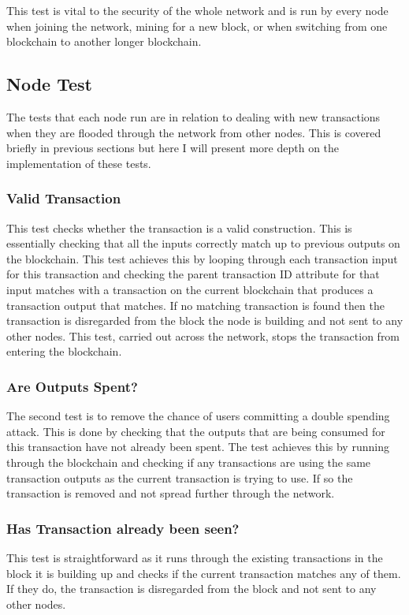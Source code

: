 \documentclass{l4proj}
\begin{document}
This test is vital to the security of the whole network and is run by every node when joining the network,
mining for a new block, or when switching from one blockchain to another longer blockchain.

\subsection{Node Test}
The tests that each node run are in relation to dealing with new transactions when they are flooded through
the network from other nodes. This is covered briefly in previous sections but here I will present more depth
on the implementation of these tests.

\subsubsection{Valid Transaction}
This test checks whether the transaction is a valid construction. This is essentially checking that all the inputs
correctly match up to previous outputs on the blockchain. This test achieves this by looping through each transaction
input for this transaction and checking the parent transaction ID attribute for that input matches with a transaction
on the current blockchain that produces a transaction output that matches. If no matching transaction is found
then the transaction is disregarded from the block the node is building and not sent to any other nodes. This test,
carried out across the network, stops the transaction from entering the blockchain.

\subsubsection{Are Outputs Spent?}
The second test is to remove the chance of users committing a double spending attack. This is done by checking
that the outputs that are being consumed for this transaction have not already been spent. The test achieves this
by running through the blockchain and checking if any transactions are using the same transaction outputs 
as the current transaction is trying to use. If so the transaction is removed and not spread further through
the network.

\subsubsection{Has Transaction already been seen?}
This test is straightforward as it runs through the existing transactions in the block it is building up and
checks if the current transaction matches any of them. If they do, the transaction is disregarded from the
block and not sent to any other nodes.
\end{document}
